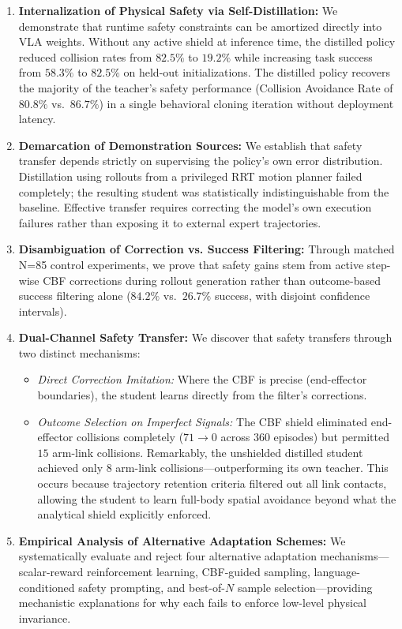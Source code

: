 \documentclass[a4paper,11pt]{report}
\begin{document}
\begin{enumerate}
    \item \textbf{Internalization of Physical Safety via Self-Distillation:} We demonstrate that runtime safety constraints can be amortized directly into VLA weights. Without any active shield at inference time, the distilled policy reduced collision rates from $82.5\%$ to $19.2\%$ while increasing task success from $58.3\%$ to $82.5\%$ on held-out initializations. The distilled policy recovers the majority of the teacher's safety performance (Collision Avoidance Rate of $80.8\%$ vs.\ $86.7\%$) in a single behavioral cloning iteration without deployment latency.
    
    \item \textbf{Demarcation of Demonstration Sources:} We establish that safety transfer depends strictly on supervising the policy's own error distribution. Distillation using rollouts from a privileged RRT motion planner failed completely; the resulting student was statistically indistinguishable from the baseline. Effective transfer requires correcting the model's own execution failures rather than exposing it to external expert trajectories.
    
    \item \textbf{Disambiguation of Correction vs. Success Filtering:} Through matched N=85 control experiments, we prove that safety gains stem from active step-wise CBF corrections during rollout generation rather than outcome-based success filtering alone ($84.2\%$ vs.\ $26.7\%$ success, with disjoint confidence intervals).
    
    \item \textbf{Dual-Channel Safety Transfer:} We discover that safety transfers through two distinct mechanisms:
    \begin{itemize}
        \item \emph{Direct Correction Imitation:} Where the CBF is precise (end-effector boundaries), the student learns directly from the filter's corrections.
        \item \emph{Outcome Selection on Imperfect Signals:} The CBF shield eliminated end-effector collisions completely ($71 \to 0$ across $360$ episodes) but permitted $15$ arm-link collisions. Remarkably, the unshielded distilled student achieved only $8$ arm-link collisions—outperforming its own teacher. This occurs because trajectory retention criteria filtered out all link contacts, allowing the student to learn full-body spatial avoidance beyond what the analytical shield explicitly enforced.
    \end{itemize}
    
    \item \textbf{Empirical Analysis of Alternative Adaptation Schemes:} We systematically evaluate and reject four alternative adaptation mechanisms—scalar-reward reinforcement learning, CBF-guided sampling, language-conditioned safety prompting, and best-of-$N$ sample selection—providing mechanistic explanations for why each fails to enforce low-level physical invariance.
\end{enumerate}
\end{document}
